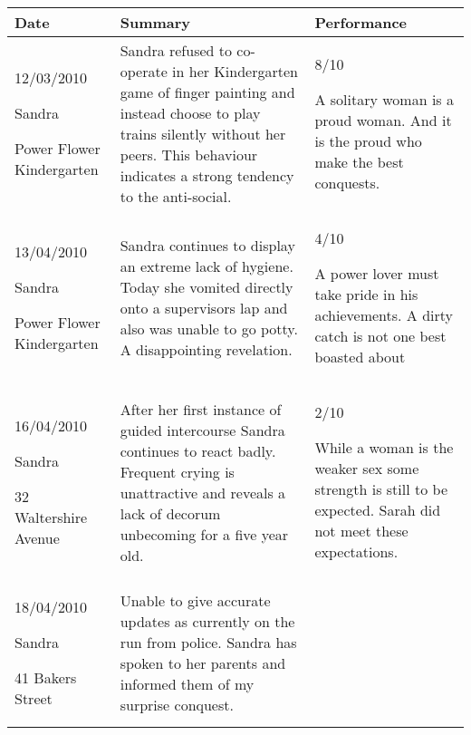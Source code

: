 \begin{longtable}{| p{} | p{} | p{} |}
\hline
\textbf{Date} & \textbf{Summary} & \textbf{Performance} \\
\hline
12/03/2010

Sandra

Power Flower Kindergarten
&
Sandra refused to co-operate in her Kindergarten game of finger painting and 
instead choose to play trains silently without her peers. This behaviour 
indicates a strong tendency to the anti-social.
&
8/10

A solitary woman is a proud woman. And it is the proud who make the best conquests. 
\\
\hline

13/04/2010

Sandra

Power Flower Kindergarten
 
&       

Sandra continues to display an extreme lack of hygiene. Today she vomited directly onto a supervisors lap and also was unable to go potty. A disappointing revelation.

&

4/10

A power lover must take pride in his achievements. A dirty catch is not one best boasted about
\\
\hline

16/04/2010

Sandra

32 Waltershire Avenue
&        

After her first instance of guided intercourse Sandra continues to react badly. Frequent crying is unattractive and reveals a lack of decorum unbecoming for a five year old.
        
&

2/10

While a woman is the weaker sex some strength is still to be expected. Sarah did not meet these expectations.

\\
\hline

18/04/2010

Sandra

41 Bakers Street

&
  

Unable to give accurate updates as currently on the run from police. Sandra has spoken to her parents and informed them of my surprise conquest.
        

\end{longtable}

